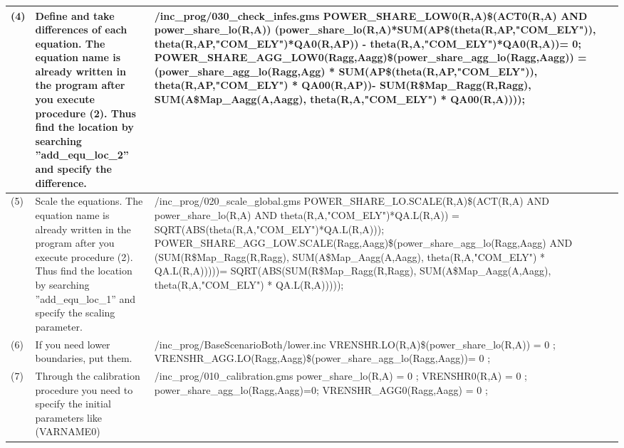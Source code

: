 \documentclass[10pt,a4paper,titlepage,dvipdfmx]{book}
\begin{document}
\begin{landscape}
\begin{tabularx}{\textwidth}{|
p{}|
p{}|
p{}|}
(4) & Define and take differences of each equation. \newline The equation name is already written in the program after you execute procedure (2). Thus find the location by searching ''add\_equ\_loc\_2'' and specify the difference. & /inc\_prog/030\_check\_infes.gms \newline POWER\_SHARE\_LOW0(R,A)\$(ACT0(R,A) AND power\_share\_lo(R,A)) (power\_share\_lo(R,A)*SUM(AP\$(theta(R,AP,"COM\_ELY")), theta(R,AP,"COM\_ELY")*QA0(R,AP)) - theta(R,A,"COM\_ELY")*QA0(R,A))= 0; \newline 
POWER\_SHARE\_AGG\_LOW0(Ragg,Aagg)\$(power\_share\_agg\_lo(Ragg,Aagg)) = (power\_share\_agg\_lo(Ragg,Agg) * SUM(AP\$(theta(R,AP,"COM\_ELY")), theta(R,AP,"COM\_ELY") * QA00(R,AP))-
SUM(R\$Map\_Ragg(R,Ragg), SUM(A\$Map\_Aagg(A,Aagg), theta(R,A,"COM\_ELY") * QA00(R,A)))); \\\hline 
(5) & Scale the equations. The equation name is already written in the program after you execute procedure (2). Thus find the location by searching ''add\_equ\_loc\_1'' and specify the scaling parameter. & /inc\_prog/020\_scale\_global.gms \newline POWER\_SHARE\_LO.SCALE(R,A)\$(ACT(R,A) AND power\_share\_lo(R,A) AND theta(R,A,"COM\_ELY")*QA.L(R,A)) = \newline
SQRT(ABS(theta(R,A,"COM\_ELY")*QA.L(R,A))); \newline
 POWER\_SHARE\_AGG\_LOW.SCALE(Ragg,Aagg)\$(power\_share\_agg\_lo(Ragg,Aagg) AND \newline
(SUM(R\$Map\_Ragg(R,Ragg), SUM(A\$Map\_Aagg(A,Aagg), theta(R,A,"COM\_ELY") * QA.L(R,A)))))= 
SQRT(ABS(SUM(R\$Map\_Ragg(R,Ragg), SUM(A\$Map\_Aagg(A,Aagg), theta(R,A,"COM\_ELY") * QA.L(R,A))))); \\\hline 
(6) & If you need lower boundaries, put them. & /inc\_prog/BaseScenarioBoth/lower.inc \newline   VRENSHR.LO(R,A)\$(power\_share\_lo(R,A)) = 0 ; \newline   VRENSHR\_AGG.LO(Ragg,Aagg)\$(power\_share\_agg\_lo(Ragg,Aagg))= 0 ; \\\hline 
(7) & Through the calibration procedure you need to specify the initial parameters like (VARNAME0) & /inc\_prog/010\_calibration.gms \newline   power\_share\_lo(R,A) = 0 ; \newline   VRENSHR0(R,A) = 0 ; \newline   power\_share\_agg\_lo(Ragg,Aagg)=0; \newline   VRENSHR\_AGG0(Ragg,Aagg) = 0 ; \\\hline 

\end{tabularx}
\end{landscape}
\end{document}
